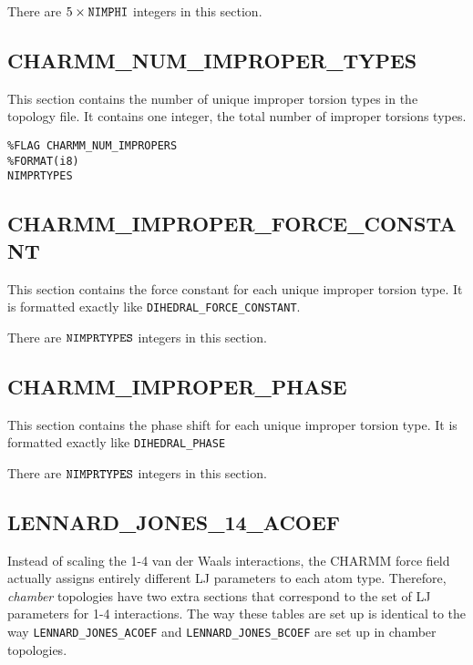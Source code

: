 
\noindent There are $5 \times {\tt NIMPHI}$ integers in this section.

\subsection*{CHARMM\_NUM\_IMPROPER\_TYPES}

This section contains the number of unique improper torsion types in the
topology file. It contains one integer, the total number of improper torsions
types.

\begin{verbatim}
%FLAG CHARMM_NUM_IMPROPERS
%FORMAT(i8)
NIMPRTYPES
\end{verbatim}

\subsection*{CHARMM\_IMPROPER\_FORCE\_CONSTANT}

This section contains the force constant for each unique improper torsion type.
It is formatted exactly like {\tt DIHEDRAL\_FORCE\_CONSTANT}.


\noindent There are ${\tt NIMPRTYPES}$ integers in this section.

\subsection*{CHARMM\_IMPROPER\_PHASE}

This section contains the phase shift for each unique improper torsion type.
It is formatted exactly like {\tt DIHEDRAL\_PHASE}


\noindent There are ${\tt NIMPRTYPES}$ integers in this section.

\subsection*{LENNARD\_JONES\_14\_ACOEF}

Instead of scaling the 1-4 van der Waals interactions, the CHARMM force field
actually assigns entirely different LJ parameters to each atom type. Therefore,
\emph{chamber} topologies have two extra sections that correspond to the set of
LJ parameters for 1-4 interactions. The way these tables are set up is identical
to the way {\tt LENNARD\_JONES\_ACOEF} and {\tt LENNARD\_JONES\_BCOEF} are set
up in chamber topologies.

